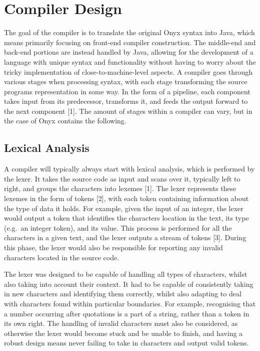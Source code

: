 \documentclass[
]{report}
\begin{document}
\section{Compiler Design}
The goal of the compiler is to translate the original Onyx syntax into
Java, which means primarily focusing on front-end compiler construction.
The middle-end and back-end portions are instead handled by Java,
allowing for the development of a language with unique syntax and
functionality without having to worry about the tricky implementation of
close-to-machine-level aspects. A compiler goes through various stages
when processing syntax, with each stage transforming the source programs
representation in some way. In the form of a pipeline, each component
takes input from its predecessor, transforms it, and feeds the output
forward to the next component {[}1{]}. The amount of stages within a
compiler can vary, but in the case of Onyx contains the following.

\subsection{Lexical Analysis}
A compiler will typically always start with lexical analysis, which is
performed by the lexer. It takes the source code as input and scans over
it, typically left to right, and groups the characters into \glspl{lexeme}
{[}1{]}. The lexer represents these \glspl{lexeme} in the form of \glspl{token}
{[}2{]}, with each \gls{token} containing information about the type of data
it holds. For example, given the input of an integer, the lexer would
output a \gls{token} that identifies the characters location in the text, its
type (e.g.~an integer \gls{token}), and its value. This process is performed
for all the characters in a given text, and the lexer outputs a stream
of \glspl{token} {[}3{]}. During this phase, the lexer would also be
responsible for reporting any invalid characters located in the source
code.

The lexer was designed to be capable of handling all types of
characters, whilst also taking into account their context. It had to be
capable of consistently taking in new characters and identifying them
correctly, whilst also adapting to deal with characters found within
particular boundaries. For example, recognising that a number occurring
after quotations is a part of a string, rather than a \gls{token} in its own
right. The handling of invalid characters must also be considered, as
otherwise the lexer would become stuck and be unable to finish, and
having a robust design means never failing to take in characters and
output valid \glspl{token}.
\end{document}
